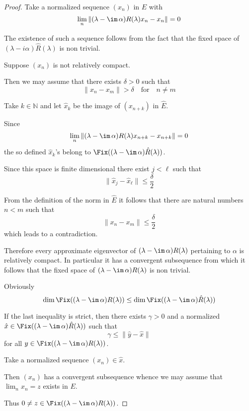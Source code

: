 \begin{proof}
Take a normalized sequence $(x_{n})$ in $E$ with
\[
\lim_{n}\|(\lambda - \im\,\alpha)R(\lambda)x_{n} - x_{n}\| = 0
\]

The existence of such a sequence follows from the fact that the fixed space of $(\lambda-i\alpha)\hat{R}(\lambda)$ is non trivial.

Suppose $(x_{n})$ is not relatively compact.

Then we may assume that there exists $\delta > 0$ such that
\[
\|x_{n} - x_{m}\| > \delta \quad \text{for} \quad n \neq m
\]

Take $k \in \mathbb{N}$ and let $\hat{x}_{k}$ be the image of $(x_{n+k})$ in $\hat{E}$.

Since
\[
\lim_{n}\|(\lambda - \im\,\alpha)R(\lambda)x_{n+k} - x_{n+k}\| = 0
\]
the so defined $\hat{x}_{k}$'s belong to $\Fix((\lambda - \im\,\alpha)\hat{R}(\lambda))$.

Since this space is finite dimensional there exist $j < \ell$ such that
\[
\|\hat{x}_{j} - \hat{x}_{\ell}\| \leq \frac{\delta}{2}
\]

From the definition of the norm in $\hat{E}$ it follows that there are natural numbers $n < m$ such that
\[
\|x_{n} - x_{m}\| \leq \frac{\delta}{2}
\]
which leads to a contradiction.

Therefore every approximate eigenvector of $(\lambda - \im\,\alpha)R(\lambda)$ pertaining to $\alpha$ is relatively compact.
In particular it has a convergent subsequence from which it follows that the fixed space of $(\lambda - \im\,\alpha)R(\lambda)$ is non trivial.

Obviously
\[
\dim \Fix((\lambda - \im\,\alpha)R(\lambda)) \leq \dim \Fix((\lambda - \im\,\alpha)\hat{R}(\lambda))
\]






If the last inequality is strict, then there exists $\gamma > 0$ and a normalized $\hat{x} \in \Fix((\lambda - \im\,\alpha)\hat{R}(\lambda))$ such that
\[
\gamma \leq \|\hat{y} - \hat{x}\|
\]
for all $y \in \Fix((\lambda - \im\,\alpha)R(\lambda))$.

Take a normalized sequence $(x_{n}) \in \hat{x}$.

Then $(x_{n})$ has a convergent subsequence whence we may assume that $\lim_{n} x_{n} = z$ exists in $E$.

Thus $0 \neq z \in \Fix((\lambda - \im\,\alpha)R(\lambda))$.


\end{proof}
